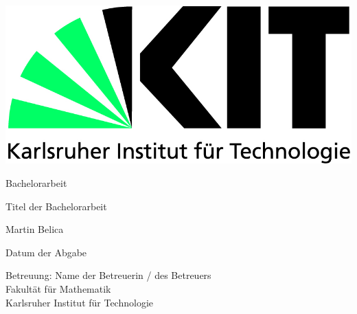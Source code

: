 \begin{titlepage}

    \includegraphics[scale=0.45,left]{kit-logo.jpg} 
    \vspace*{2.5cm} 

 \begin{center} \Large 
    
    Bachelorarbeit
    \vspace*{3cm}

    {\Huge Titel der Bachelorarbeit}
    \vspace*{3.5cm}

    Martin Belica
    \vspace*{2.5cm}

    Datum der Abgabe
    \vspace*{5cm}


    Betreuung: Name der Betreuerin / des Betreuers \\[0.9cm]
    Fakultät für Mathematik \\[0.9cm]
		Karlsruher Institut für Technologie
  \end{center}
  \vspace{2cm}
\end{titlepage}
